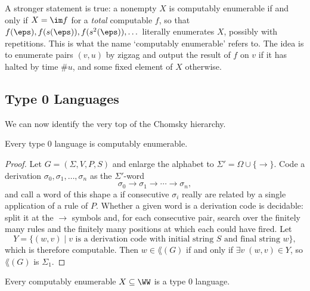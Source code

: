 \begin{remark}
	A stronger statement is true: a nonempty $X$ is computably enumerable if and only if $X = \im f$ for a \emph{total} computable $f$, so that $f(\eps), f(s(\eps)), f(s^2(\eps)), \dots$ literally enumerates $X$, possibly with repetitions. This is what the name `computably enumerable' refers to. The idea is to enumerate pairs $(v,u)$ by zigzag and output the result of $f$ on $v$ if it has halted by time $\#u$, and some fixed element of $X$ otherwise.
\end{remark}

\subsection{Type 0 Languages}

We can now identify the very top of the Chomsky hierarchy.

\begin{theorem}\label{thm:type0ce}
	Every type $0$ language is computably enumerable.
\end{theorem}

\begin{proof}
	Let $G = (\Sigma,V,P,S)$ and enlarge the alphabet to $\Sigma' = \Omega \cup \{\bm\to\}$. Code a derivation $\sigma_0, \sigma_1, \dots, \sigma_n$ as the $\Sigma'$-word
	$$\sigma_0 \bm\to \sigma_1 \bm\to \cdots \bm\to \sigma_n,$$
	and call a word of this shape a  if consecutive $\sigma_i$ really are related by a single application of a rule of $P$. Whether a given word is a derivation code is decidable: split it at the $\bm\to$ symbols and, for each consecutive pair, search over the finitely many rules and the finitely many positions at which each could have fired. Let
	$$Y = \{(w,v) \mid v \text{ is a derivation code with initial string } S \text{ and final string } w\},$$
	which is therefore computable. Then $w \in \lang(G)$ if and only if $\exists v\; (w,v)\in Y$, so $\lang(G)$ is $\Sigma_1$.
\end{proof}

\begin{theorem}\label{thm:cetype0}
	Every computably enumerable $X \subseteq \WW$ is a type $0$ language.
\end{theorem}

